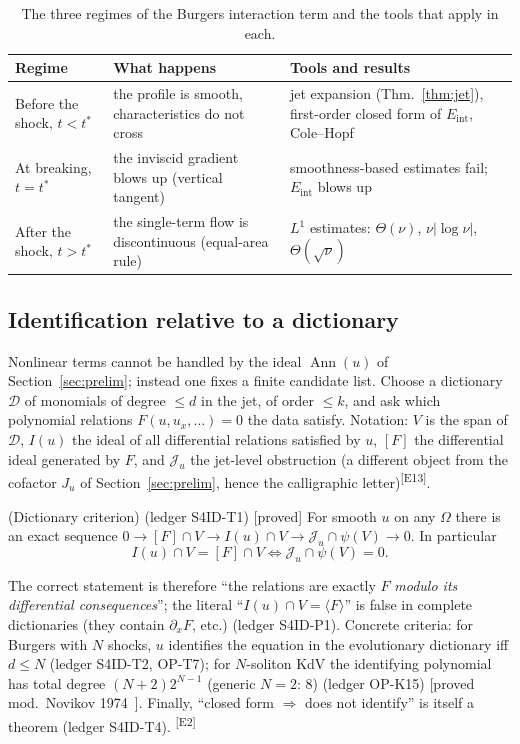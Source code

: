 \documentclass[11pt,a4paper]{article}
\theoremstyle{definition}
\newcommand{\badge}[2]{\textcolor{#1}{\textsf{\footnotesize[#2]}}}
\newcommand{\proved}[1][]{\badge{cC}{proved#1}}
\newcommand{\modulo}[1]{\badge{cD}{proved mod.\ #1}}
\newcommand{\led}[1]{\textcolor{cG}{\textsf{\footnotesize(ledger #1)}}}
\newcommand{\edmark}[1]{\textsuperscript{\textcolor{cB}{\textsf{[#1]}}}}
\newcommand{\Ann}{\operatorname{Ann}}
\newcommand{\Eint}{E_{\mathrm{int}}}
\begin{document}
\begin{table}[!htb]
\centering\small
\begin{tabular}{@{}L{3.0cm}L{4.9cm}L{6.2cm}@{}}
\toprule
Regime & What happens & Tools and results\\\midrule
Before the shock, $t<t^*$ & the profile is smooth, characteristics do not cross & jet expansion (Thm.~\ref{thm:jet}), first-order closed form of $\Eint$, Cole--Hopf\\
At breaking, $t=t^*$ & the inviscid gradient blows up (vertical tangent) & smoothness-based estimates fail; $\Eint$ blows up\\
After the shock, $t>t^*$ & the single-term flow is discontinuous (equal-area rule) & $L^1$ estimates: $\Theta(\nu)$, $\nu|\log\nu|$, $\Theta(\sqrt\nu)$\\
\bottomrule
\end{tabular}
\caption{The three regimes of the Burgers interaction term and the tools that apply in each.}\label{tab:regimes}
\end{table}



\subsection{Identification relative to a dictionary}
Nonlinear terms cannot be handled by the ideal $\Ann(u)$ of Section~\ref{sec:prelim}; instead one fixes a finite candidate list. Choose a dictionary $\mathcal D$ of monomials of degree $\le d$ in the jet, of order $\le k$, and ask which polynomial relations $F(u,u_x,\dots)=0$ the data satisfy. Notation: $V$ is the span of $\mathcal D$, $I(u)$ the ideal of all differential relations satisfied by $u$, $[F]$ the differential ideal generated by $F$, and $\mathcal J_u$ the jet-level obstruction (a different object from the cofactor $J_u$ of Section~\ref{sec:prelim}, hence the calligraphic letter)\edmark{E13}.
\begin{theorem}{(Dictionary criterion) \led{S4ID-T1} \proved[]}\label{thm:dict}
For smooth $u$ on any $\Omega$ there is an exact sequence $0\to[F]\cap V\to I(u)\cap V\to\mathcal J_u\cap\psi(V)\to0$. In particular
\[
I(u)\cap V=[F]\cap V\iff\mathcal J_u\cap\psi(V)=0 .
\]
\end{theorem}
The correct statement is therefore ``the relations are exactly $F$ \emph{modulo its differential consequences}''; the literal ``$I(u)\cap V=\langle F\rangle$'' is false in complete dictionaries (they contain $\partial_xF$, etc.) \led{S4ID-P1}. Concrete criteria: for Burgers with $N$ shocks, $u$ identifies the equation in the evolutionary dictionary iff $d\le N$ \led{S4ID-T2, OP-T7}; for $N$-soliton KdV the identifying polynomial has total degree $(N+2)2^{N-1}$ (generic $N=2$: $8$) \led{OP-K15} \modulo{Novikov 1974~\cite{no}}. Finally, ``closed form $\Rightarrow$ does not identify'' is itself a theorem \led{S4ID-T4}.
\edmark{E2}
\end{document}
